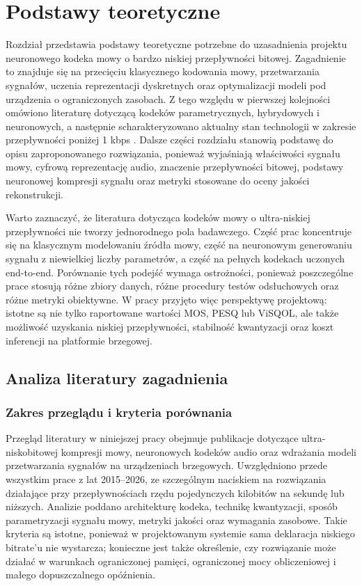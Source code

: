 \chapter{Podstawy teoretyczne}
\label{ch:podstawy-teoretyczne}

Rozdział przedstawia podstawy teoretyczne potrzebne do uzasadnienia projektu neuronowego kodeka mowy o bardzo niskiej przepływności bitowej. Zagadnienie to znajduje się na przecięciu klasycznego kodowania mowy, przetwarzania sygnałów, uczenia reprezentacji dyskretnych oraz optymalizacji modeli pod urządzenia o ograniczonych zasobach. Z tego względu w pierwszej kolejności omówiono literaturę dotyczącą kodeków parametrycznych, hybrydowych i neuronowych, a następnie scharakteryzowano aktualny stan technologii w zakresie przepływności poniżej 1 kbps \cite{Rowe2019Codec2,Valin2019LPCNet,Zeghidour2021SoundStream,Defossez2022Encodec}. Dalsze części rozdziału stanowią podstawę do opisu zaproponowanego rozwiązania, ponieważ wyjaśniają właściwości sygnału mowy, cyfrową reprezentację audio, znaczenie przepływności bitowej, podstawy neuronowej kompresji sygnału oraz metryki stosowane do oceny jakości rekonstrukcji.

Warto zaznaczyć, że literatura dotycząca kodeków mowy o ultra-niskiej przepływności nie tworzy jednorodnego pola badawczego. Część prac koncentruje się na klasycznym modelowaniu źródła mowy, część na neuronowym generowaniu sygnału z niewielkiej liczby parametrów, a część na pełnych kodekach uczonych end-to-end. Porównanie tych podejść wymaga ostrożności, ponieważ poszczególne prace stosują różne zbiory danych, różne procedury testów odsłuchowych oraz różne metryki obiektywne. W pracy przyjęto więc perspektywę projektową: istotne są nie tylko raportowane wartości MOS, PESQ lub ViSQOL, ale także możliwość uzyskania niskiej przepływności, stabilność kwantyzacji oraz koszt inferencji na platformie brzegowej.

\section{Analiza literatury zagadnienia}
\label{sec:analiza-literatury}

\subsection{Zakres przeglądu i kryteria porównania}
\label{subsec:zakres-przegladu-literatury}

Przegląd literatury w niniejszej pracy obejmuje publikacje dotyczące ultra-niskobitowej kompresji mowy, neuronowych kodeków audio oraz wdrażania modeli przetwarzania sygnałów na urządzeniach brzegowych. Uwzględniono przede wszystkim prace z lat 2015--2026, ze szczególnym naciskiem na rozwiązania działające przy przepływnościach rzędu pojedynczych kilobitów na sekundę lub niższych. Analizie poddano architekturę kodeka, technikę kwantyzacji, sposób parametryzacji sygnału mowy, metryki jakości oraz wymagania zasobowe. Takie kryteria są istotne, ponieważ w projektowanym systemie sama deklaracja niskiego bitrate'u nie wystarcza; konieczne jest także określenie, czy rozwiązanie może działać w warunkach ograniczonej pamięci, ograniczonej mocy obliczeniowej i małego dopuszczalnego opóźnienia.

